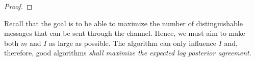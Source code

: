\begin{proof}
%
%
%
%
%
\end{proof}

Recall that the goal is to be able to maximize the number of distinguishable messages that can be sent through the channel. Hence, we must aim to make both $m$ and $I$ as large as possible. The algorithm can only influence $I$ and, therefore, good algorithms \emph{shall maximize the expected log posterior agreement}.


